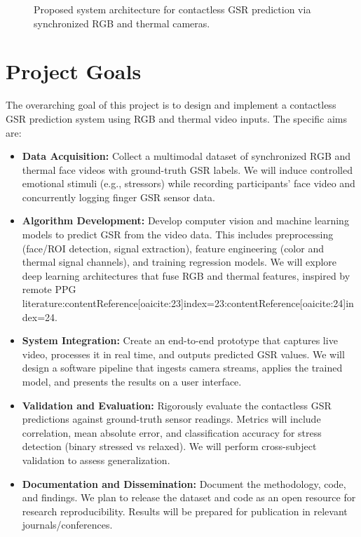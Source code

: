\documentclass[12pt]{article}
\begin{document}
    \begin{figure}[ht]
        \centering
        \caption{Proposed system architecture for contactless GSR prediction via synchronized RGB and thermal cameras.}
        \label{fig:architecture}
    \end{figure}


    \section{Project Goals}
    The overarching goal of this project is to design and implement a contactless GSR prediction system using RGB and thermal video inputs. The specific aims are:
    \begin{itemize}
        \item \textbf{Data Acquisition:} Collect a multimodal dataset of synchronized RGB and thermal face videos with ground-truth GSR labels. We will induce controlled emotional stimuli (e.g., stressors) while recording participants’ face video and concurrently logging finger GSR sensor data.
        \item \textbf{Algorithm Development:} Develop computer vision and machine learning models to predict GSR from the video data. This includes preprocessing (face/ROI detection, signal extraction), feature engineering (color and thermal signal channels), and training regression models. We will explore deep learning architectures that fuse RGB and thermal features, inspired by remote PPG literature:contentReference[oaicite:23]{index=23}:contentReference[oaicite:24]{index=24}.
        \item \textbf{System Integration:} Create an end-to-end prototype that captures live video, processes it in real time, and outputs predicted GSR values. We will design a software pipeline that ingests camera streams, applies the trained model, and presents the results on a user interface.
        \item \textbf{Validation and Evaluation:} Rigorously evaluate the contactless GSR predictions against ground-truth sensor readings. Metrics will include correlation, mean absolute error, and classification accuracy for stress detection (binary stressed vs relaxed). We will perform cross-subject validation to assess generalization.
        \item \textbf{Documentation and Dissemination:} Document the methodology, code, and findings. We plan to release the dataset and code as an open resource for research reproducibility. Results will be prepared for publication in relevant journals/conferences.
    \end{itemize}
\end{document}

